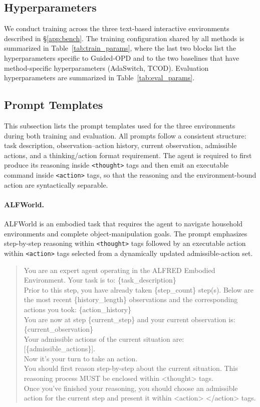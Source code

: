 \documentclass[11pt]{article}
\begin{document}
\subsection{Hyperparameters}
\label{app:hparam}

We conduct training across the three text-based interactive environments described in \S\ref{app:bench}. The training configuration shared by all methods is summarized in Table~\ref{tab:train_params}, where the last two blocks list the hyperparameters specific to Guided-OPD and to the two baselines that have method-specific hyperparameters (AdaSwitch, TCOD). Evaluation hyperparameters are summarized in Table~\ref{tab:eval_params}.

\subsection{Prompt Templates}
\label{app:prompts}

This subsection lists the prompt templates used for the three environments during both training and evaluation. All prompts follow a consistent structure: task description, observation--action history, current observation, admissible actions, and a thinking/action format requirement. The agent is required to first produce its reasoning inside \texttt{<thought>} tags and then emit an executable command inside \texttt{<action>} tags, so that the reasoning and the environment-bound action are syntactically separable.

\paragraph{ALFWorld.}
ALFWorld is an embodied task that requires the agent to navigate household environments and complete object-manipulation goals. The prompt emphasizes step-by-step reasoning within \texttt{<thought>} tags followed by an executable action within \texttt{<action>} tags selected from a dynamically updated admissible-action set.

\begin{quote}
\small\ttfamily
You are an expert agent operating in the ALFRED Embodied Environment. Your task is to: \{task\_description\}\\[2pt]
Prior to this step, you have already taken \{step\_count\} step(s). Below are the most recent \{history\_length\} observations and the corresponding actions you took: \{action\_history\}\\[2pt]
You are now at step \{current\_step\} and your current observation is: \{current\_observation\}\\[2pt]
Your admissible actions of the current situation are: [\{admissible\_actions\}].\\[6pt]
Now it's your turn to take an action.\\[2pt]
You should first reason step-by-step about the current situation. This reasoning process MUST be enclosed within <thought> tags.\\[2pt]
Once you've finished your reasoning, you should choose an admissible action for the current step and present it within <action> </action> tags.
\end{quote}
\end{document}
